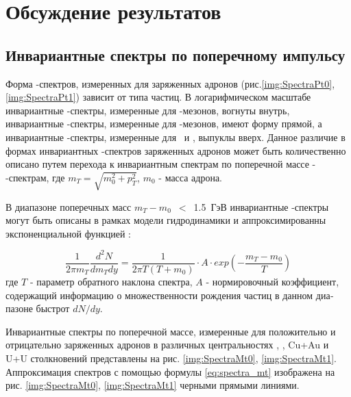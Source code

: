 \chapter{Обсуждение результатов} \label{chapt5}

\section{Инвариантные спектры по поперечному импульсу} \label{sect5_spectra}

Форма \pt-спектров, измеренных для заряженных адронов (рис.\ref{img:SpectraPt0}, \ref{img:SpectraPt1}) зависит от типа частиц. В логарифмическом масштабе инвариантные \pt-спектры, измеренные для \pipm-мезонов, вогнуты внутрь, инвариантные \pt-спектры, измеренные для \Kpm-мезонов, имеют форму прямой, а инвариантные \pt-спектры, измеренные для \prot \ и \aprot, выпуклы вверх.
Данное различие в формах инвариантных \pt-спектров заряженных адронов может быть количественно описано путем перехода к инвариантным спектрам по поперечной массе - \mt-спектрам, где $m_T = \sqrt{m_{0}^{2} + p_{T}^{2}}$, $m_0$ - масса адрона. 

В диапазоне поперечных масс $m_T-m_0$~$<$~1.5~ГэВ инвариантные \mt-спектры могут быть описаны в рамках модели гидродинамики \cite{PPG026, HydroPartonicCascade} и аппроксимированны экспоненциальной функцией \cite{ToutModels}:

\begin{equation}
	\label{eq:spectra_mt}
	\frac{1}{2\pi m_T} \frac{d^2 N}{dm_T dy}=\frac{1}{2\pi T (T+m_0)}\cdot A \cdot exp \left( -\frac{m_T - m_0}{T}\right)
\end{equation}
где $T$ - параметр обратного наклона спектра, $A$ - нормировочный коэффициент, содержащий информацию о множественности рождения частиц в данном диа­пазоне быстрот $dN/dy$.

Инвариантные спектры по поперечной массе, измеренные для положительно и отрицательно заряженных адронов в различных центральностях \pal, \heau, Cu+Au и U+U столкновений представлены на рис. \ref{img:SpectraMt0}, \ref{img:SpectraMt1}. Аппроксимация спектров с помощью формулы \ref{eq:spectra_mt} изображена на рис. \ref{img:SpectraMt0}, \ref{img:SpectraMt1} черными прямыми линиями.

